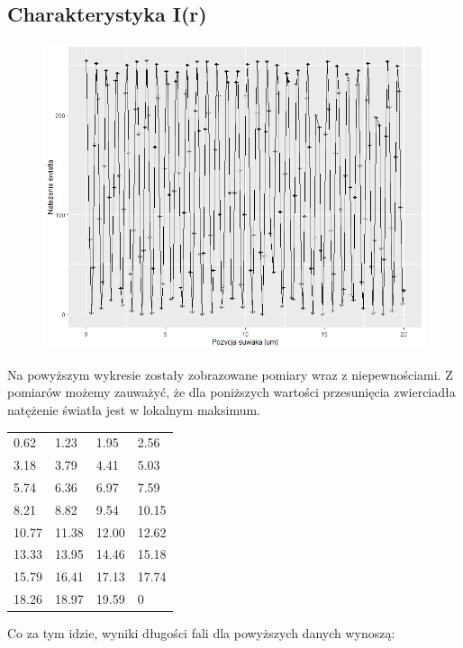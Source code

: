 \documentclass{article}
\begin{document}
\subsection{Charakterystyka I(r)}
\begin{figure}[H]
\centerline{\includegraphics[scale=0.8]{Rplot.png}}
\end{figure}
Na powyższym wykresie zostały zobrazowane pomiary wraz z niepewnościami.
Z pomiarów możemy zauważyć, że dla poniższych wartości przesunięcia zwierciadła natężenie światła jest w lokalnym maksimum. 

\begin{table}[h!]
\centering
\begin{tabular}{|l|l|l|l|}
\hline
0.62  & 1.23  & 1.95  &  2.56 \\ 
3.18  & 3.79  & 4.41  &  5.03 \\  
5.74  & 6.36  & 6.97  &  7.59 \\ 
8.21  & 8.82  & 9.54  & 10.15 \\
10.77 & 11.38 & 12.00 &  12.62 \\
13.33 & 13.95 & 14.46 & 15.18 \\
15.79 & 16.41 & 17.13 & 17.74 \\
18.26 & 18.97 & 19.59 & 0 \\
\hline
\end{tabular}
\end{table}
Co za tym idzie, wyniki długości fali dla powyższych danych wynoszą:
\end{document}
